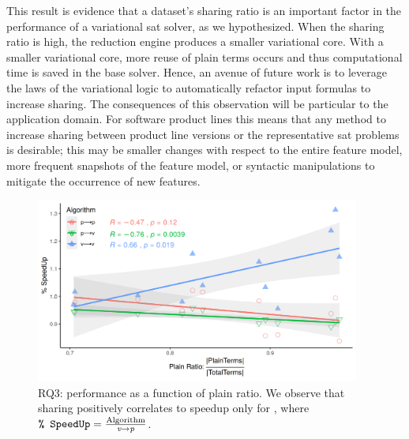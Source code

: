 This result is evidence that a dataset's sharing ratio is an important factor in
the performance of a variational \ac{sat} solver, as we hypothesized. When the
sharing ratio is high, the reduction engine produces a smaller variational core.
With a smaller variational core, more reuse of plain terms occurs and thus
computational time is saved in the base solver. Hence, an avenue of future work
is to leverage the laws of the variational logic to automatically refactor input
formulas to increase sharing. The consequences of this observation will be
particular to the application domain. For software product lines this means that
any method to increase sharing between product line versions or the
representative \ac{sat} problems is desirable; this may be smaller changes with
respect to the entire feature model, more frequent snapshots of the feature
model, or syntactic manipulations to mitigate the occurrence of new features.

\begin{figure}
  \includegraphics[width=0.95\textwidth]{Plots/RQ3}
  \caption{RQ3: performance as a function of plain ratio. We observe that
    sharing positively correlates to speedup only for \vTov{}, where $\texttt{\%
      SpeedUp} = \frac{{\text{Algorithm}}}{{\text{$\textit{v}{\rightarrow}\textit{p}${}}}}$.}%
  \label{res:speedup}
\end{figure}

